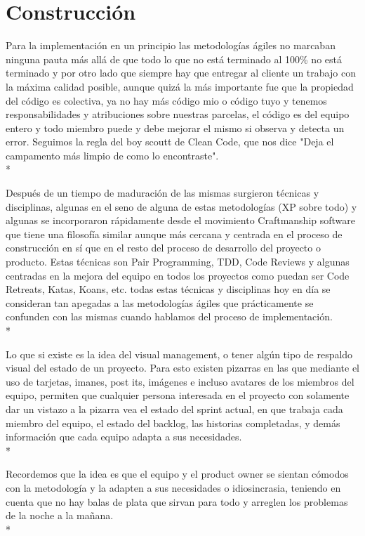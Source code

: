 \documentclass[../pfc.tex]{subfiles}
\begin{document}
	
	\section{Construcción}
	
	Para la implementación en un principio las metodologías ágiles no marcaban ninguna pauta más allá de que todo lo que no está terminado al 100\% no está terminado y por otro lado que siempre hay que entregar al cliente un trabajo con la máxima calidad posible, aunque quizá la más importante fue que la propiedad del código es colectiva, ya no hay más código mio o código tuyo y tenemos responsabilidades y atribuciones sobre nuestras parcelas, el código es del equipo entero y todo miembro puede y debe mejorar el mismo si observa y detecta un error. Seguimos la regla del boy scoutt de Clean Code\cite{cleancode}, que nos dice "Deja el campamento más limpio de como lo encontraste".\\*
	
	Después de un tiempo de maduración de las mismas surgieron técnicas y disciplinas, algunas en el seno de alguna de estas metodologías (XP sobre todo) y algunas se incorporaron rápidamente desde el movimiento Craftmanship software \cite{manifestocraft} que tiene una filosofía similar aunque más cercana y centrada en el proceso de construcción en sí que en el resto del proceso de desarrollo del proyecto o producto. Estas técnicas son Pair Programming, TDD, Code Reviews y algunas centradas en la mejora del equipo en todos los proyectos como puedan ser Code Retreats, Katas, Koans, etc. todas estas técnicas y disciplinas hoy en día se consideran tan apegadas a las metodologías ágiles que prácticamente se confunden con las mismas cuando hablamos del proceso de implementación.\\*
	
	Lo que si existe es la idea del visual management, o tener algún tipo de respaldo visual del estado de un proyecto. Para esto existen pizarras en las que mediante el uso de tarjetas, imanes, post its, imágenes e incluso avatares de los miembros del equipo, permiten que cualquier persona interesada en el proyecto con solamente dar un vistazo a la pizarra vea el estado del sprint actual, en que trabaja cada miembro del equipo, el estado del backlog, las historias completadas, y demás información que cada equipo adapta a sus necesidades.\\*
	
	Recordemos que la idea es que el equipo y el product owner se sientan cómodos con la metodología y la adapten a sus necesidades o idiosincrasia, teniendo en cuenta que no hay balas de plata que sirvan para todo y arreglen los problemas de la noche a la mañana.\\* 
	
\end{document}
